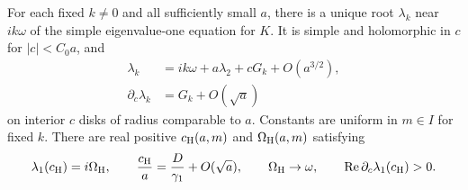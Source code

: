 \begin{proposition}\label{prop:return-root}
For each fixed $k\ne0$ and all sufficiently small $a$, there is a unique
root $\lambda_k$ near $ik\omega$ of the simple eigenvalue-one equation
for $K$. It is simple and holomorphic in $c$ for $|c|<C_0a$, and
\begin{align}
 \lambda_k&=ik\omega+a\lambda_2+cG_k+O(a^{3/2}),   \label{eq:true-root}\\
 \partial_c\lambda_k&=G_k+O(\sqrt a)              \label{eq:root-derivative}
\end{align}
on interior $c$ disks of radius comparable to $a$. Constants are
uniform in $m\in I$ for fixed $k$. There are real positive
$c_{\mathrm H}(a,m)$ and $\Omega_{\mathrm H}(a,m)$ satisfying
\begin{equation}\label{eq:crossing}
 \lambda_1(c_{\mathrm H})=i\Omega_{\mathrm H},\qquad
 \frac{c_{\mathrm H}}{a}=\frac D{\gamma_1}+O(\sqrt a),\qquad
 \Omega_{\mathrm H}\to\omega,\qquad
 \operatorname{Re}\partial_c\lambda_1(c_{\mathrm H})>0.
\end{equation}
\end{proposition}

